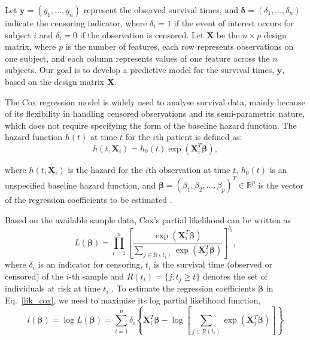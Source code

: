 Let \( \bm{y} = (y_1, \dots, y_n) \) represent the observed survival times, and \( \bm{\delta} = (\delta_1, \dots, \delta_n) \) indicate the censoring indicator, where \( \delta_i = 1 \) if the event of interest occurs for subject \( i \) and \( \delta_i = 0 \) if the observation is censored. Let  \(\mathbf{ X} \) be the \( n \times p \) design matrix, where \( p \) is the number of features, each row represents observations on one subject, and each column represents values of one feature across the \( n \) subjects. 
Our goal is to develop a predictive model for the survival times, 
$\bm{y}$, based on the design matrix \( \mathbf{ X} \).

The Cox regression model \citep{cox1972regression} is widely used to analyse survival data, mainly because of its flexibility in handling censored observations and its semi-parametric nature, which does not require specifying the form of the baseline hazard function. The hazard function \( h(t) \) at time \( t \) for the \( i \)th patient is defined as:
\begin{equation}
h(t, \boldsymbol{X}_i) = h_0(t) \exp(\boldsymbol{X}_i^T \boldsymbol{\beta}),
\end{equation}

\noindent where \( h(t, \boldsymbol{X}_i) \) is the hazard for the \( i \)th observation at time \( t \),
\( h_0(t) \) is an unspecified baseline hazard function, and \( \boldsymbol{\beta} = (\beta_1, \beta_2, \dots, \beta_p)^T \in \mathbb{R}^p \) is the vector of the regression coefficients to be estimated \citep{gui2005penalized}.

Based on the available sample data, Cox’s partial likelihood \citep{cox1972regression} can be written as
\begin{equation}
\label{lik_cox}
L(\boldsymbol{\beta}) = \prod_{i=1}^{n} \left[ \frac{\exp(\boldsymbol{X}_i^T \boldsymbol{\beta})}{\sum_{j \in R(t_i)} \exp(\boldsymbol{X}_j^T \boldsymbol{\beta})} \right]^{\delta_i},
\end{equation}
where \( \delta_i \) is an indicator for censoring, \( t_{i} \) is the survival time (observed or censored) of the 
$i$-th sample and \( R(t_i) = \{ j : t_j \geq t \} \) denotes the set of individuals at risk at time \( t_{i} \) \citep{simon2011regularization}.
To estimate the regression coefficients \( \boldsymbol{\beta} \) in Eq.~\eqref{lik_cox}, we
need to maximise its log partial likelihood function,
\begin{equation}
\label{eq:log_likelihood}
l(\boldsymbol{\beta} ) = \log L(\boldsymbol{\beta} ) =
\sum_{i=1}^n \delta_i \left\{ \mathbf{X}_i^T \boldsymbol{\beta} - \log \left[ \sum_{j \in R(t_i)} \exp{\left( \mathbf{X}_j^T \boldsymbol{\beta} \right)} \right] \right\}
\end{equation}

